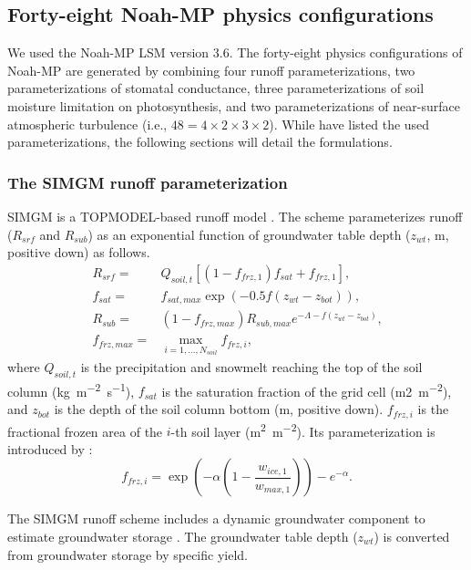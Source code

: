 \documentclass[essd]{copernicus}
\begin{document}
\subsection{Forty-eight Noah-MP physics configurations} \label{sec:data:noahmp}

We used the Noah-MP LSM version 3.6. The forty-eight physics configurations of
Noah-MP are generated by combining four runoff parameterizations, two
parameterizations of stomatal conductance, three parameterizations of soil
moisture limitation on photosynthesis, and two parameterizations of near-surface
atmospheric turbulence (i.e., $48 = 4 \times 2 \times 3 \times 2$). While
\citet[Table 1]{zheng2019WRR} have listed the used parameterizations, the
following sections will detail the formulations.

\subsubsection{The SIMGM runoff parameterization}

SIMGM is a TOPMODEL-based runoff model \citep{niu2007JGRA}. The scheme
parameterizes runoff ($R_{srf}$ and $R_{sub}$) as an exponential function of
groundwater table depth ($z_{wt}$, \unit{m}, positive down) as follows.
\begin{align}
    R_{srf} =     & Q_{soil,t} [(1 - f_{frz,1}) f_{sat} + f_{frz,1} ] \text{,}                \\
    f_{sat} =     & f_{sat,max} \exp(-0.5 f (z_{wt} - z_{bot})) \text{,}                      \\
    R_{sub} =     & (1 - f_{frz,max}) R_{sub,max} e^{-\Lambda - f(z_{wt} - z_{bot})} \text{,} \\
    f_{frz,max} = & \max_{i=1,\dots,N_{soil}} f_{frz,i} \text{,}
\end{align}
where $Q_{soil,t}$ is the precipitation and snowmelt reaching the top of the
soil column (\unit{kg~m^{-2}~s^{-1}}), $f_{sat}$ is the saturation fraction of
the grid cell (\unit{m2~m^{-2}}), and $z_{bot}$ is the depth of the soil column
bottom (\unit{m}, positive down). $f_{frz,i}$ is the fractional frozen area of
the $i$-th soil layer (\unit{m^2~m^{-2}}). Its parameterization is introduced by
\citet{niu2006JH}:
\begin{equation}
    f_{frz,i} = \exp\left(-\alpha(1 - \frac{w_{ice,1}}{w_{max,1}})\right) - e^{-\alpha} \text{.}
\end{equation}

The SIMGM runoff scheme includes a dynamic groundwater component to estimate
groundwater storage \citep{niu2007JGRA}. The groundwater table depth ($z_{wt}$)
is converted from groundwater storage by specific yield.
\end{document}
